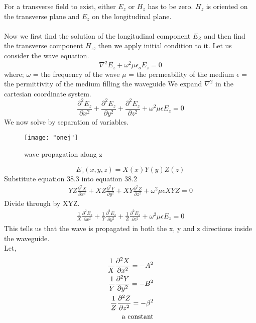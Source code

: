 For a transverse field to exist, either $ E_{z} $ or $ H_{z} $ has to be zero. $ H_{z} $ is oriented on the transverse plane and $ E_{z} $ on the longitudinal plane.\\
\\

Now we first find the solution of the longitudinal component $ E_{Z} $ and then find the transverse component $ H_{z} $, then we apply initial condition to it.
Let us consider the wave equation.\\
\begin{equation}
\nabla^{2}\bar{E_{z}} + \omega^{2}\mu\epsilon_{o}\bar{E_{z}} = 0
\end{equation}
where;  
$ \omega $   = the frequency of the wave
$ \mu $   = the permeability of the medium
$ \epsilon $ = the permittivity of the medium filling the waveguide
We expand $ \nabla^{2} $ in the cartesian coordinate system.
\begin{equation}
\frac{\partial ^{2} E_z}{\partial x^2} + \frac{\partial ^2 E_z}{\partial y^2} + \frac{\partial ^2 E_z}{\partial z^2}+ \omega^2\mu\epsilon {E_{z}} = 0
\end{equation}
We now solve by separation of variables.
\begin{figure}
	\centering
	\texttt{[image: "onej"]}
	\caption{wave propagation along z}
	\label{fig:one}
\end{figure}

\begin{equation}
E_z (x,y,z) = X(x)Y(y)Z(z)
\end{equation}
Substitute equation 38.3 into equation 38.2
\begin{align}
YZ \frac{\partial ^{2} X}{\partial x^2} + XZ \frac{\partial ^2 Y}{\partial y^2} + XY \frac{\partial ^2 Z}{\partial z^2}+ \omega^2\mu\epsilon {XYZ} = 0
\end{align}
Divide through by XYZ.
\begin{align}
\frac{1}{X}\frac{\partial ^{2} E_z}{\partial x^2} + \frac{1}{Y}\frac{\partial ^2 E_z}{\partial y^2} + \frac{1}{Z} \frac{\partial ^2 E_z}{\partial z^2} + \omega^2\mu\epsilon {E_{z}} = 0
\end{align}
This tells us that the wave is propagated in both the x, y and z directions inside the waveguide.\\
Let,  
\begin{align*}
\frac{1}{X}\frac{\partial^2 X}{\partial x^2} = -A^2\\
\frac{1}{Y}\frac{\partial^2 Y}{\partial y^2} = -B^2\\
\frac{1}{Z}\frac{\partial^2 Z}{\partial z^2} = -\beta^2\\
\textnormal{a constant}   
\end{align*}

